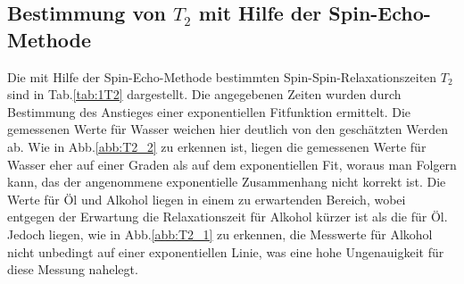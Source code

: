 \documentclass[numbers=noenddot,a4paper,notitlepage,twoside,BCOR15mm]{scrartcl}
\begin{document}
	\subsection{Bestimmung von $T_2$ mit Hilfe der Spin-Echo-Methode}
	
	Die mit Hilfe der Spin-Echo-Methode bestimmten Spin-Spin-Relaxationszeiten $T_2$ sind in Tab.\ref{tab:1T2} dargestellt. Die angegebenen Zeiten wurden durch Bestimmung des Anstieges einer exponentiellen Fitfunktion ermittelt. Die gemessenen Werte für Wasser weichen hier deutlich von den geschätzten Werden ab. Wie in Abb.\ref{abb:T2_2} zu erkennen ist, liegen die gemessenen Werte für Wasser eher auf einer Graden als auf dem exponentiellen Fit, woraus man Folgern kann, das der angenommene exponentielle Zusammenhang nicht korrekt ist. Die Werte für Öl und Alkohol liegen in einem zu erwartenden Bereich, wobei entgegen der Erwartung die Relaxationszeit für Alkohol kürzer ist als die für Öl. Jedoch liegen, wie in Abb.\ref{abb:T2_1} zu erkennen, die Messwerte für Alkohol nicht unbedingt auf einer exponentiellen Linie, was eine hohe Ungenauigkeit für diese Messung nahelegt.
	
\end{document}
